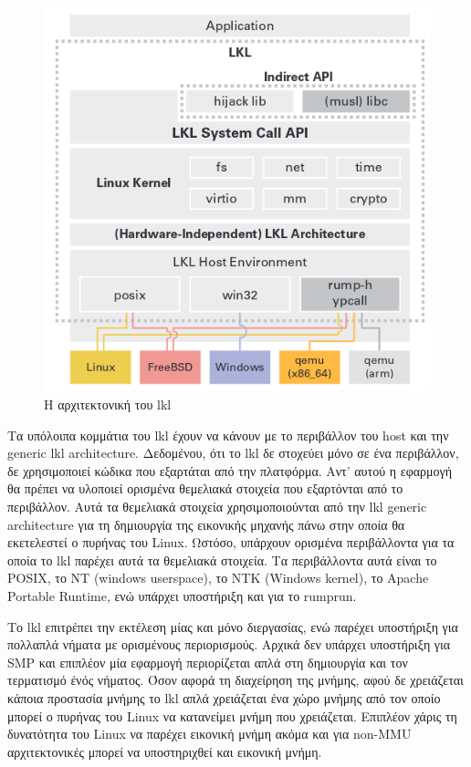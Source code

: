 \begin{figure}[htp]
\centering
\includegraphics[scale=0.6]{figures/lkl.png}
	\caption{Η αρχιτεκτονική του lkl\label{fig3_6}}
\end{figure}

Τα υπόλοιπα κομμάτια του lkl έχουν να κάνουν με το περιβάλλον του host και την
generic lkl architecture. Δεδομένου, ότι το lkl δε στοχεύει μόνο σε ένα
περιβάλλον, δε χρησιμοποιεί κώδικα που εξαρτάται από την πλατφόρμα. Αντ' αυτού η
εφαρμογή θα πρέπει να υλοποιεί ορισμένα θεμελιακά στοιχεία που εξαρτόνται από το
περιβάλλον. Αυτά τα θεμελιακά στοιχεία χρησιμοποιούνται από την lkl generic
architecture για τη δημιουργία της εικονικής μηχανής πάνω στην οποία θα
εκετελεστεί ο πυρήνας του Linux. Ωστόσο, υπάρχουν ορισμένα περιβάλλοντα για τα
οποία το lkl παρέχει αυτά τα θεμελιακά στοιχεία. Τα περιβάλλοντα αυτά είναι το 
POSIX, το ΝΤ (windows userspace), το NTK (Windows kernel), το Apache Portable
Runtime, ενώ υπάρχει υποστήριξη και για το rumprun. 

Το lkl επιτρέπει την εκτέλεση μίας και μόνο διεργασίας, ενώ παρέχει υποστήριξη
για πολλαπλά νήματα με ορισμένους περιορισμούς. Αρχικά δεν υπάρχει υποστήριξη
για SMP και επιπλέον μία εφαρμογή περιορίζεται απλά στη δημιουργία και τον
τερματισμό ένός νήματος. Όσον αφορά τη διαχείρηση της μνήμης, αφού δε χρειάζεται
κάποια προστασία μνήμης το lkl απλά χρειάζεται ένα χώρο μνήμης από τον οποίο
μπορεί ο πυρήνας του Linux να κατανείμει μνήμη που χρειάζεται. Επιπλέον χάρις τη
δυνατότητα του Linux να παρέχει εικονική μνήμη ακόμα και για non-MMU
αρχιτεκτονικές μπορεί να υποστηριχθεί και εικονική μνήμη. 

